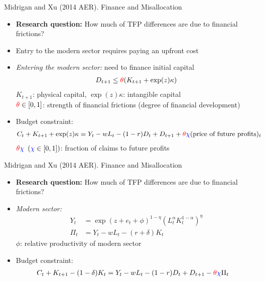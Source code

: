 \documentclass[aspectratio=169,compress,t,xcolor=table]{beamer}
\begin{document}
\begin{frame}{}
Midrigan and Xu (2014 AER). Finance and Misallocation
  \begin{itemize}
    \item {\color{MyStructure}\textbf{Research question:}} How much of TFP differences are due to financial frictions?
    \item Entry to the modern sector requires paying an upfront cost
    \vfill\item {\color{MyStructure}\textit{Entering the modern sector:}} need to finance initial capital
    \begin{align*}
      D_{t+1} \leq {\color{red}\theta} (K_{t+1} + \exp(z) \kappa)
    \end{align*}
    \(K_{t+1}\): physical capital, \(\exp(z) \kappa\): intangible capital \\
    \({\color{red}\theta} \in [0,1]\): strength of financial frictions (degree of financial development)
    \vfill\item Budget constraint:
    \begin{align*}
      C_t + K_{t+1} + \exp(z) \kappa &= Y_t - w L_t - (1-r) D_t + D_{t+1} + {\color{red}\theta} {\color{blue}\chi} (\text{price of future profits})_t
    \end{align*}
    \({\color{red}\theta} {\color{blue}\chi} \enskip ({\color{blue}\chi} \in [0,1])\): fraction of claims to future profits
  \end{itemize}
\end{frame}

\begin{frame}{}
Midrigan and Xu (2014 AER). Finance and Misallocation
  \begin{itemize}
    \item {\color{MyStructure}\textbf{Research question:}} How much of TFP differences are due to financial frictions?
    \vfill\item {\color{MyStructure}\textit{Modern sector:}} 
    \begin{align*}
      Y_t &= \exp(z + e_t + \phi)^{1-\eta} (L_t^{\alpha} K_t^{1-\alpha})^{\eta} \\
      \Pi_t &= Y_t - wL_t - (r+\delta)K_t
    \end{align*}
    \(\phi\): relative productivity of modern sector
    \vfill\item Budget constraint:
    \begin{align*}
      C_t + K_{t+1} - (1-\delta)K_t &= Y_t - wL_t - (1-r) D_t + D_{t+1} - {\color{red}\theta} {\color{blue}\chi} \Pi_t
    \end{align*}
  \end{itemize}
\end{frame}
\end{document}
